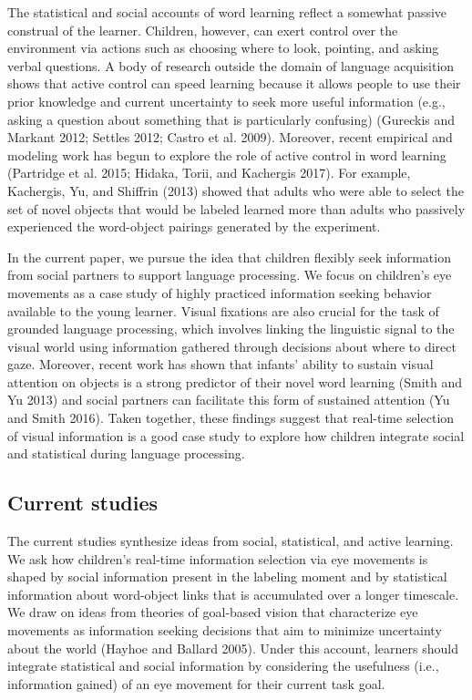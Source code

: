 \documentclass[10pt, letterpaper]{article}
\begin{document}
The statistical and social accounts of word learning reflect a somewhat
passive construal of the learner. Children, however, can exert control
over the environment via actions such as choosing where to look,
pointing, and asking verbal questions. A body of research outside the
domain of language acquisition shows that active control can speed
learning because it allows people to use their prior knowledge and
current uncertainty to seek more useful information (e.g., asking a
question about something that is particularly confusing) (Gureckis and
Markant 2012; Settles 2012; Castro et al. 2009). Moreover, recent
empirical and modeling work has begun to explore the role of active
control in word learning (Partridge et al. 2015; Hidaka, Torii, and
Kachergis 2017). For example, Kachergis, Yu, and Shiffrin (2013) showed
that adults who were able to select the set of novel objects that would
be labeled learned more than adults who passively experienced the
word-object pairings generated by the experiment.

In the current paper, we pursue the idea that children flexibly seek
information from social partners to support language processing. We
focus on children's eye movements as a case study of highly practiced
information seeking behavior available to the young learner. Visual
fixations are also crucial for the task of grounded language processing,
which involves linking the linguistic signal to the visual world using
information gathered through decisions about where to direct gaze.
Moreover, recent work has shown that infants' ability to sustain visual
attention on objects is a strong predictor of their novel word learning
(Smith and Yu 2013) and social partners can facilitate this form of
sustained attention (Yu and Smith 2016). Taken together, these findings
suggest that real-time selection of visual information is a good case
study to explore how children integrate social and statistical during
language processing.

\hypertarget{current-studies}{%
\subsection{Current studies}\label{current-studies}}

The current studies synthesize ideas from social, statistical, and
active learning. We ask how children's real-time information selection
via eye movements is shaped by social information present in the
labeling moment and by statistical information about word-object links
that is accumulated over a longer timescale. We draw on ideas from
theories of goal-based vision that characterize eye movements as
information seeking decisions that aim to minimize uncertainty about the
world (Hayhoe and Ballard 2005). Under this account, learners should
integrate statistical and social information by considering the
usefulness (i.e., information gained) of an eye movement for their
current task goal.
\end{document}
